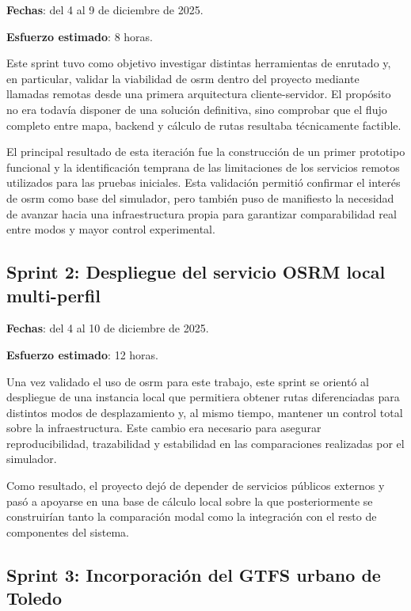 \textbf{Fechas}: del 4 al 9 de diciembre de 2025.

\textbf{Esfuerzo estimado}: 8 horas.\newline

Este sprint tuvo como objetivo investigar distintas herramientas de enrutado y, en particular, validar la viabilidad de \gls{osrm} dentro del proyecto mediante llamadas remotas desde una primera arquitectura cliente-servidor. El propósito no era todavía disponer de una solución definitiva, sino comprobar que el flujo completo entre mapa, backend y cálculo de rutas resultaba técnicamente factible.\newline

El principal resultado de esta iteración fue la construcción de un primer prototipo funcional y la identificación temprana de las limitaciones de los servicios remotos utilizados para las pruebas iniciales. Esta validación permitió confirmar el interés de \gls{osrm} como base del simulador, pero también puso de manifiesto la necesidad de avanzar hacia una infraestructura propia para garantizar comparabilidad real entre modos y mayor control experimental.\newline

\subsection{Sprint 2: Despliegue del servicio OSRM local multi-perfil}

\textbf{Fechas}: del 4 al 10 de diciembre de 2025.

\textbf{Esfuerzo estimado}: 12 horas.\newline

Una vez validado el uso de \gls{osrm} para este trabajo, este sprint se orientó al despliegue de una instancia local que permitiera obtener rutas diferenciadas para distintos modos de desplazamiento y, al mismo tiempo, mantener un control total sobre la infraestructura. Este cambio era necesario para asegurar reproducibilidad, trazabilidad y estabilidad en las comparaciones realizadas por el simulador.\newline

Como resultado, el proyecto dejó de depender de servicios públicos externos y pasó a apoyarse en una base de cálculo local sobre la que posteriormente se construirían tanto la comparación modal como la integración con el resto de componentes del sistema.
\newpage
\subsection{Sprint 3: Incorporación del GTFS urbano de Toledo}

